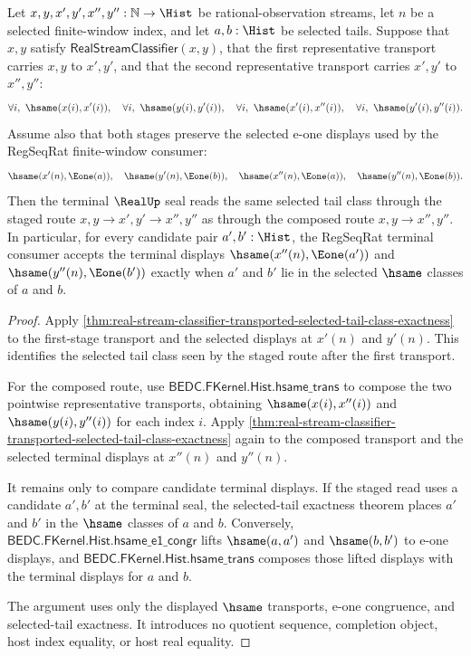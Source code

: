 \begin{theorem}
\label{thm:realup-regseqrat-terminal-seal-functoriality}
Let $x,y,x',y',x'',y'':\mathbb{N}\to\Hist$ be rational-observation streams,
let $n$ be a selected finite-window index, and let $a,b:\Hist$ be selected
tails. Suppose that $x,y$ satisfy $\mathsf{RealStreamClassifier}(x,y)$, that
the first representative transport carries $x,y$ to $x',y'$, and that the
second representative transport carries $x',y'$ to $x'',y''$:
$$
\forall i,\ \hsame(x(i),x'(i)),\quad
\forall i,\ \hsame(y(i),y'(i)),\quad
\forall i,\ \hsame(x'(i),x''(i)),\quad
\forall i,\ \hsame(y'(i),y''(i)).
$$
Assume also that both stages preserve the selected e-one displays used by the
RegSeqRat finite-window consumer:
$$
\hsame(x'(n),\Eone(a)),\quad
\hsame(y'(n),\Eone(b)),\quad
\hsame(x''(n),\Eone(a)),\quad
\hsame(y''(n),\Eone(b)).
$$
Then the terminal $\RealUp$ seal reads the same selected tail class through the
staged route $x,y\to x',y'\to x'',y''$ as through the composed route
$x,y\to x'',y''$. In particular, for every candidate pair
$a',b':\Hist$, the RegSeqRat terminal consumer accepts the terminal displays
$\hsame(x''(n),\Eone(a'))$ and $\hsame(y''(n),\Eone(b'))$ exactly when
$a'$ and $b'$ lie in the selected $\hsame$ classes of $a$ and $b$.
\end{theorem}
\begin{proof}
Apply
\autoref{thm:real-stream-classifier-transported-selected-tail-class-exactness}
to the first-stage transport and the selected displays at $x'(n)$ and
$y'(n)$. This identifies the selected tail class seen by the staged route
after the first transport.

For the composed route, use $\mathsf{BEDC.FKernel.Hist.hsame\_trans}$ to
compose the two pointwise representative transports, obtaining
$\hsame(x(i),x''(i))$ and $\hsame(y(i),y''(i))$ for each index $i$. Apply
\autoref{thm:real-stream-classifier-transported-selected-tail-class-exactness}
again to the composed transport and the selected terminal displays at
$x''(n)$ and $y''(n)$.

It remains only to compare candidate terminal displays. If the staged read
uses a candidate $a',b'$ at the terminal seal, the selected-tail exactness
theorem places $a'$ and $b'$ in the $\hsame$ classes of $a$ and $b$. Conversely,
$\mathsf{BEDC.FKernel.Hist.hsame\_e1\_congr}$ lifts $\hsame(a,a')$ and
$\hsame(b,b')$ to e-one displays, and
$\mathsf{BEDC.FKernel.Hist.hsame\_trans}$ composes those lifted displays with
the terminal displays for $a$ and $b$.

The argument uses only the displayed $\hsame$ transports, e-one congruence, and
selected-tail exactness. It introduces no quotient sequence, completion object,
host index equality, or host real equality.
\end{proof}
